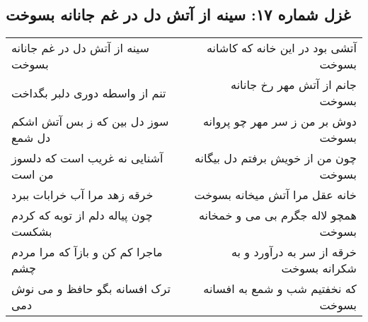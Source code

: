 \begin{center}
\section*{غزل شماره ۱۷: سینه از آتش دل در غم جانانه بسوخت}
\label{sec:sh017}
\begin{longtable}{l p{0.5cm} r}
سینه از آتش دل در غم جانانه بسوخت
&&
آتشی بود در این خانه که کاشانه بسوخت
\\
تنم از واسطه دوری دلبر بگداخت
&&
جانم از آتش مهر رخ جانانه بسوخت
\\
سوز دل بین که ز بس آتش اشکم دل شمع
&&
دوش بر من ز سر مهر چو پروانه بسوخت
\\
آشنایی نه غریب است که دلسوز من است
&&
چون من از خویش برفتم دل بیگانه بسوخت
\\
خرقه زهد مرا آب خرابات ببرد
&&
خانه عقل مرا آتش میخانه بسوخت
\\
چون پیاله دلم از توبه که کردم بشکست
&&
همچو لاله جگرم بی می و خمخانه بسوخت
\\
ماجرا کم کن و بازآ که مرا مردم چشم
&&
خرقه از سر به درآورد و به شکرانه بسوخت
\\
ترک افسانه بگو حافظ و می نوش دمی
&&
که نخفتیم شب و شمع به افسانه بسوخت
\\
\end{longtable}
\end{center}
